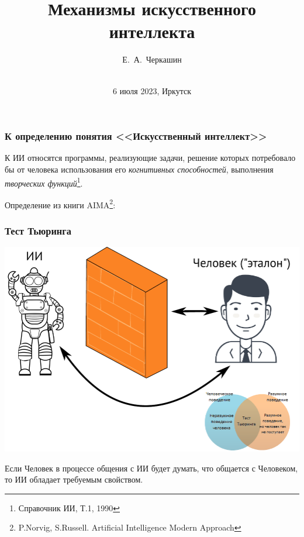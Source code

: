 \documentclass[10pt]{beamer}
\begin{document}
\setlength{\parindent}{1em}
\title{Механизмы искусственного интеллекта}

\author{Е.~А.~Черкашин}
\date[07.2023]{{}\\[1.5cm]
6 июля 2023, Иркутск
}
\maketitle

\begin{frame}[fragile]
  \frametitle{К определению понятия <<Искусственный интеллект>>}

  К ИИ относятся программы, реализующие задачи, решение которых потребовало бы от человека использования его \emph{когнитивных способностей}, выполнения \emph{творческих функций}\footnote{Справочник ИИ, Т.1, 1990}.

  \vspace{1em}

  Определение из книги AIMA\footnote{P.Norvig, S.Russell. Artificial Intelligence Modern Approach}:
  \begin{center}
  \end{center}
\end{frame}

\begin{frame}
  \frametitle{Тест Тьюринга}
  \begin{center}
    \includegraphics[width=0.9\linewidth]{pics/turing-test.pdf}
  \end{center}

  Если Человек в процессе общения с ИИ будет думать, что общается с Человеком, то ИИ обладает требуемым свойством.
\end{frame}
\end{document}
